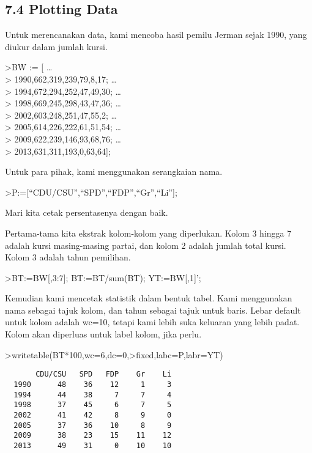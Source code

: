 \documentclass[
]{book}
\begin{document}
\subsection{7.4 Plotting Data}\label{plotting-data}

Untuk merencanakan data, kami mencoba hasil pemilu Jerman sejak 1990, yang diukur dalam jumlah kursi.

\textgreater BW := {[} \ldots{}\\
\textgreater{} 1990,662,319,239,79,8,17; \ldots{}\\
\textgreater{} 1994,672,294,252,47,49,30; \ldots{}\\
\textgreater{} 1998,669,245,298,43,47,36; \ldots{}\\
\textgreater{} 2002,603,248,251,47,55,2; \ldots{}\\
\textgreater{} 2005,614,226,222,61,51,54; \ldots{}\\
\textgreater{} 2009,622,239,146,93,68,76; \ldots{}\\
\textgreater{} 2013,631,311,193,0,63,64{]};

Untuk para pihak, kami menggunakan serangkaian nama.

\textgreater P:={[}``CDU/CSU'',``SPD'',``FDP'',``Gr'',``Li''{]};

Mari kita cetak persentasenya dengan baik.

Pertama-tama kita ekstrak kolom-kolom yang diperlukan. Kolom 3 hingga 7 adalah kursi masing-masing partai, dan kolom 2 adalah jumlah total kursi. Kolom 3 adalah tahun pemilihan.

\textgreater BT:=BW{[},3:7{]}; BT:=BT/sum(BT); YT:=BW{[},1{]}';

Kemudian kami mencetak statistik dalam bentuk tabel. Kami menggunakan nama sebagai tajuk kolom, dan tahun sebagai tajuk untuk baris. Lebar default untuk kolom adalah wc=10, tetapi kami lebih suka keluaran yang lebih padat. Kolom akan diperluas untuk label kolom, jika perlu.

\textgreater writetable(BT*100,wc=6,dc=0,\textgreater fixed,labc=P,labr=YT)

\begin{verbatim}
       CDU/CSU   SPD   FDP    Gr    Li
  1990      48    36    12     1     3
  1994      44    38     7     7     4
  1998      37    45     6     7     5
  2002      41    42     8     9     0
  2005      37    36    10     8     9
  2009      38    23    15    11    12
  2013      49    31     0    10    10
\end{verbatim}
\end{document}
